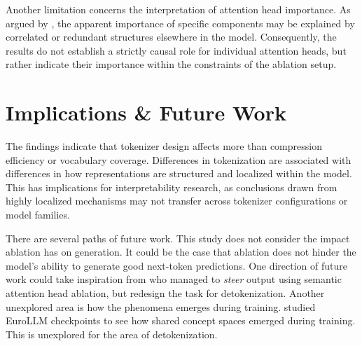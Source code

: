 Another limitation concerns the interpretation of attention head importance. As argued by \citet{wiegreffe2019}, the apparent importance of specific components may be explained by correlated or redundant structures elsewhere in the model. Consequently, the results do not establish a strictly causal role for individual attention heads, but rather indicate their importance within the constraints of the ablation setup.

\section{Implications \& Future Work}\label{sec:discussion_futurework}

The findings indicate that tokenizer design affects more than compression efficiency or vocabulary coverage. Differences in tokenization are associated with differences in how representations are structured and localized within the model. This has implications for interpretability research, as conclusions drawn from highly localized mechanisms may not transfer across tokenizer configurations or model families.

There are several paths of future work. This study does not consider the impact ablation has on generation. It could be the case that ablation does not hinder the model's ability to generate good next-token predictions. One direction of future work could take inspiration from \citet{basile2026} who managed to \textit{steer} output using semantic attention head ablation, but redesign the task for detokenization. Another unexplored area is how the phenomena emerges during training. \citet{korner2026} studied EuroLLM checkpoints to see how shared concept spaces emerged during training. This is unexplored for the area of detokenization.

